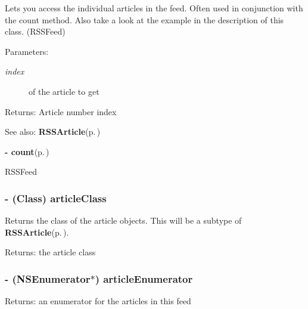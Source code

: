 Lets you access the individual articles in the feed. Often used in conjunction with the count method. Also take a look at the example in the description of this class. (RSSFeed)

\begin{Desc}
\item[Parameters:]
\begin{description}
\item[{\em index}]of the article to get \end{description}
\end{Desc}
\begin{Desc}
\item[Returns:]Article number index \end{Desc}
\begin{Desc}
\item[See also:]{\bf RSSArticle}{\rm (p.\,\pageref{interfaceRSSArticle})} 

{\bf - count}{\rm (p.\,\pageref{interfaceRSSFeed_a7})} 

RSSFeed\end{Desc}
\subsubsection{\setlength{\rightskip}{0pt plus 5cm}- (Class) article\-Class }\label{interfaceRSSFeed_a18}


Returns the class of the article objects. This will be a subtype of {\bf RSSArticle}{\rm (p.\,\pageref{interfaceRSSArticle})}.

\begin{Desc}
\item[Returns:]the article class\end{Desc}
\subsubsection{\setlength{\rightskip}{0pt plus 5cm}- (NSEnumerator$\ast$) article\-Enumerator }\label{interfaceRSSFeed_a8}


\begin{Desc}
\item[Returns:]an enumerator for the articles in this feed\end{Desc}
